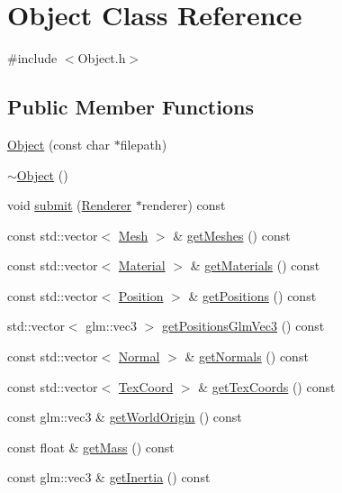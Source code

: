 \hypertarget{class_object}{}\section{Object Class Reference}
\label{class_object}


{\ttfamily \#include $<$Object.\+h$>$}

\subsection*{Public Member Functions}
\begin{DoxyCompactItemize}
\item 
\hyperlink{class_object_a8524d31fc25bf997ae127b85ffebe23e}{Object} (const char $\ast$filepath)
\item 
\hyperlink{class_object_ae8f5483f459e46687bd01e6f9977afd3}{$\sim$\+Object} ()
\item 
void \hyperlink{class_object_abcecd0a84919c1abeee1f95044fbf1c1}{submit} (\hyperlink{class_renderer}{Renderer} $\ast$renderer) const
\item 
const std\+::vector$<$ \hyperlink{class_mesh}{Mesh} $>$ \& \hyperlink{class_object_a0c73a3e0bcadac01866e022cbe327082}{get\+Meshes} () const
\item 
const std\+::vector$<$ \hyperlink{class_material}{Material} $>$ \& \hyperlink{class_object_a69844ac34730373cb824a608727fa6ff}{get\+Materials} () const
\item 
const std\+::vector$<$ \hyperlink{struct_position}{Position} $>$ \& \hyperlink{class_object_a7dde4f00d9004f52ddcd12077dbd71b8}{get\+Positions} () const
\item 
std\+::vector$<$ glm\+::vec3 $>$ \hyperlink{class_object_a1d0e144917e58aab0c97e15c796c08dd}{get\+Positions\+Glm\+Vec3} () const
\item 
const std\+::vector$<$ \hyperlink{struct_normal}{Normal} $>$ \& \hyperlink{class_object_afc89c45ef455b9e1fc95d49514d48373}{get\+Normals} () const
\item 
const std\+::vector$<$ \hyperlink{struct_tex_coord}{Tex\+Coord} $>$ \& \hyperlink{class_object_a215c16f0d10edb9d21d41eca96a782d7}{get\+Tex\+Coords} () const
\item 
const glm\+::vec3 \& \hyperlink{class_object_a1054369eab029c63e58de78b88bbd627}{get\+World\+Origin} () const
\item 
const float \& \hyperlink{class_object_a334afec6a91a5c6473d75858771597a2}{get\+Mass} () const
\item 
const glm\+::vec3 \& \hyperlink{class_object_a2d23e6dad9e8c355dda6b3f466d202f3}{get\+Inertia} () const

\end{DoxyCompactItemize}
